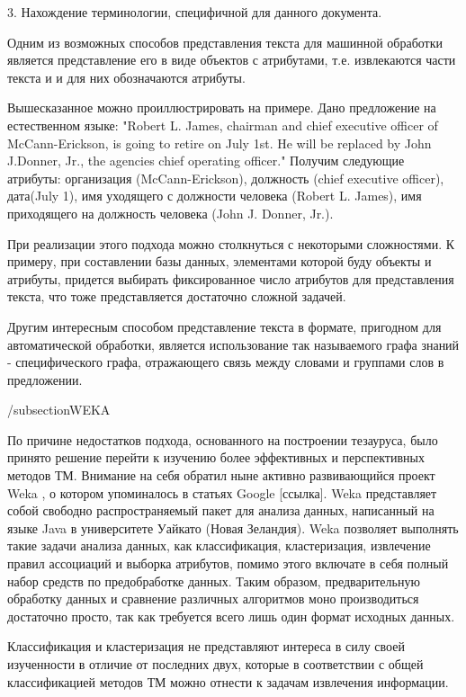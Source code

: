 3. Нахождение терминологии, специфичной для данного документа.

Одним из возможных способов представления текста для машинной обработки является
представление его в виде объектов с атрибутами, т.е. извлекаются части текста и 
и для них обозначаются атрибуты.

Вышесказанное можно проиллюстрировать на примере. Дано предложение на 
естественном языке: "Robert L. James, chairman and chief executive
officer of McCann-Erickson, is going to retire on July 1st.  He will
be replaced by John J.Donner, Jr., the agencies chief operating
officer."  Получим следующие атрибуты: организация (McCann-Erickson),
должность (chief executive officer), дата(July 1), имя уходящего с
должности человека (Robert L. James), имя приходящего на должность
человека (John J. Donner, Jr.).

При реализации этого подхода можно столкнуться с некоторыми сложностями. 
К примеру, при составлении базы данных, элементами которой буду объекты и
атрибуты, придется выбирать фиксированное число атрибутов для представления
текста, что тоже представляется достаточно сложной задачей.

Другим интересным способом представление текста в формате, пригодном для
автоматической обработки, является использование так называемого графа знаний - 
специфического графа, отражающего связь между словами и группами слов в предложении.

/subsection{WEKA}

По причине недостатков подхода, основанного на построении тезауруса, было принято решение перейти к 
изучению более эффективных и перспективных методов ТМ. Внимание на себя обратил ныне активно
развивающийся проект Weka \cite{weka}, о котором упоминалось в статьях Google [ссылка]. %
Weka представляет собой свободно распространяемый пакет для анализа данных, 
написанный на языке Java в университете Уайкато (Новая Зеландия). Weka позволяет 
выполнять такие задачи анализа данных, как классификация, кластеризация, извлечение 
правил ассоциаций и выборка атрибутов, помимо этого включате в себя полный набор
средств по предобработке данных. Таким образом, предварительную обработку данных 
и сравнение различных алгоритмов моно производиться достаточно просто, так как 
требуется всего лишь один формат исходных данных.



Классификация и кластеризация не представляют интереса в силу своей изученности в отличие от
последних двух, которые в соответствии с общей классификацией методов ТМ можно отнести к задачам
извлечения информации.

